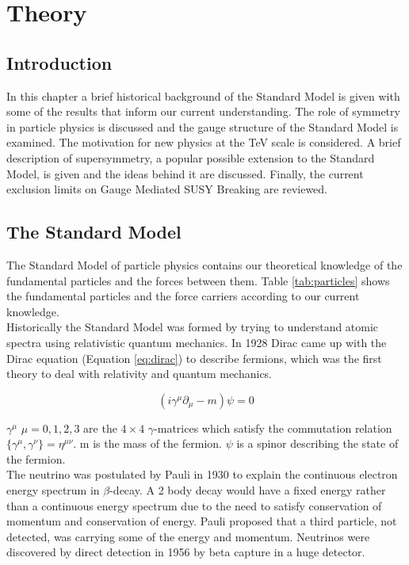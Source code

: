 \chapter{Theory}

\section{Introduction}

In this chapter a brief historical background of the Standard Model is given
with some of the results that inform our current understanding. The role of
symmetry in particle physics is discussed and the gauge structure of the
Standard Model is examined. The motivation for new physics at the TeV scale is
considered. A brief description of supersymmetry, a popular possible extension 
to the Standard Model, is given and the ideas behind it are discussed. Finally,
the current exclusion limits on Gauge Mediated SUSY Breaking are reviewed. 

\section{The Standard Model}

The Standard Model of particle physics contains our theoretical knowledge of the
fundamental particles and the forces between them. Table \ref{tab:particles}
shows the fundamental particles and the force carriers according to our current
knowledge. \\

Historically the Standard Model was formed by trying to understand atomic
spectra using relativistic quantum mechanics. In 1928 Dirac came up with the
Dirac equation (Equation \ref{eq:dirac}) to describe fermions, which was the 
first theory to deal with relativity and quantum mechanics. 

\begin{equation}
\left(i\gamma^{\mu}\partial_{\mu} - m\right)\psi = 0
\label{eq:dirac}
\end{equation}

$\gamma^{\mu}$ $\mu = 0, 1, 2, 3$ are the $4\times4$ $\gamma$-matrices which 
satisfy the commutation relation $\{\gamma^{\mu},\gamma^{\nu}\} = \eta^{\mu\nu}$. 
m is the mass of the fermion. $\psi$ is a spinor describing the state of the 
fermion. \\

The neutrino was postulated by Pauli in 1930 to explain the continuous electron 
energy spectrum in $\beta$-decay. A 2 body decay would have a fixed energy
rather than a continuous energy spectrum due to the need to satisfy conservation
of momentum and conservation of energy. Pauli proposed that a third particle,
not detected, was carrying some of the energy and momentum. Neutrinos were 
discovered by direct detection in 1956 by beta capture in a huge detector. \\


